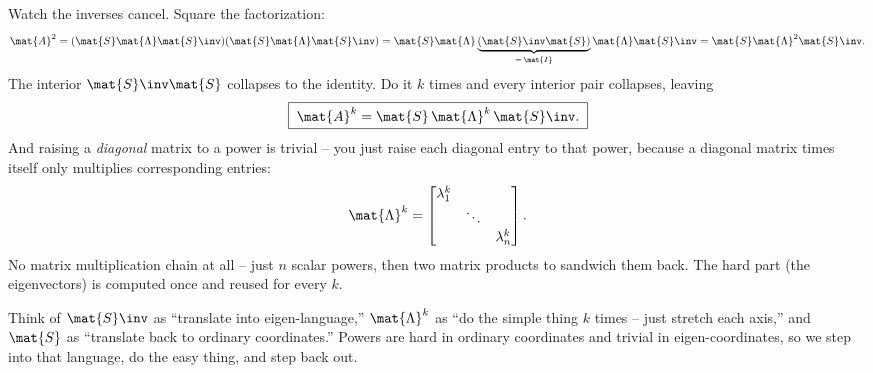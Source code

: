 Watch the inverses cancel. Square the factorization:
\[
  \mat{A}^2
  = (\mat{S}\mat{\Lambda}\mat{S}\inv)(\mat{S}\mat{\Lambda}\mat{S}\inv)
  = \mat{S}\mat{\Lambda}\underbrace{(\mat{S}\inv\mat{S})}_{=\,\mat{I}}\mat{\Lambda}\mat{S}\inv
  = \mat{S}\mat{\Lambda}^2\mat{S}\inv.
\]
The interior $\mat{S}\inv\mat{S}$ collapses to the identity. Do it $k$ times and
every interior pair collapses, leaving
\[
  \boxed{\;\mat{A}^k = \mat{S}\,\mat{\Lambda}^k\,\mat{S}\inv.\;}
\]
And raising a \emph{diagonal} matrix to a power is trivial -- you just raise each
diagonal entry to that power, because a diagonal matrix times itself only
multiplies corresponding entries:
\[
  \mat{\Lambda}^k
  = \begin{bmatrix} \lambda_1^k & & \\ & \ddots & \\ & & \lambda_n^k \end{bmatrix}.
\]
No matrix multiplication chain at all -- just $n$ scalar powers, then two matrix
products to sandwich them back. The hard part (the eigenvectors) is computed once
and reused for every $k$.

\begin{intuitionbox}
Think of $\mat{S}\inv$ as ``translate into eigen-language,'' $\mat{\Lambda}^k$ as
``do the simple thing $k$ times -- just stretch each axis,'' and $\mat{S}$ as
``translate back to ordinary coordinates.'' Powers are hard in ordinary
coordinates and trivial in eigen-coordinates, so we step into that language, do
the easy thing, and step back out.
\end{intuitionbox}

